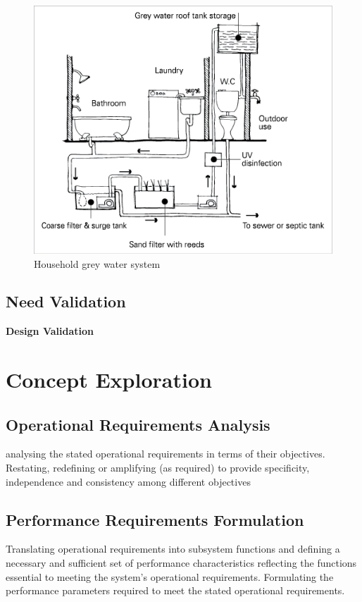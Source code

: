 \documentclass[a4paper,11pt,fleqn]{report}
\begin{document}
\begin{figure}[h!]
\begin{center}
\includegraphics[scale = 1.2]{Household_Grey_Water.png}
\caption{Household grey water system}
\label{fig: Grey water system}
\end{center}
\end{figure}



\subsection{Need Validation}
\textbf{Design Validation}

\section{Concept Exploration}
\subsection{Operational Requirements Analysis}
analysing the stated operational requirements in terms of their
objectives. Restating, redefining or amplifying (as required) to provide
specificity, independence and consistency among different
objectives

\subsection{Performance Requirements Formulation}
Translating operational requirements into subsystem functions and defining a necessary and sufficient set of performance characteristics reflecting the functions essential to meeting the system’s operational requirements. Formulating the performance parameters required to meet the stated operational requirements.
\end{document}
